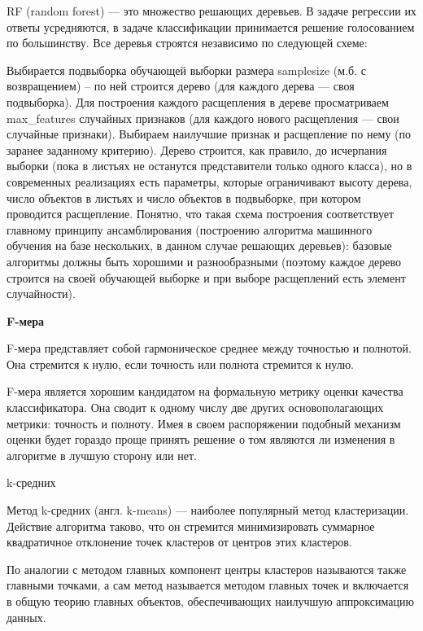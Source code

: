 \documentclass[14pt,a4paper]{scrartcl}
\begin{document}
RF (random forest) — это множество решающих деревьев. В задаче регрессии их ответы усредняются, в задаче классификации принимается решение голосованием по большинству. Все деревья строятся независимо по следующей схеме:

Выбирается подвыборка обучающей выборки размера samplesize (м.б. с возвращением) – по ней строится дерево (для каждого дерева — своя подвыборка).
Для построения каждого расщепления в дереве просматриваем max\_features случайных признаков (для каждого нового расщепления — свои случайные признаки).
Выбираем наилучшие признак и расщепление по нему (по заранее заданному критерию). Дерево строится, как правило, до исчерпания выборки (пока в листьях не останутся представители только одного класса), но в современных реализациях есть параметры, которые ограничивают высоту дерева, число объектов в листьях и число объектов в подвыборке, при котором проводится расщепление.
Понятно, что такая схема построения соответствует главному принципу ансамблирования (построению алгоритма машинного обучения на базе нескольких, в данном случае решающих деревьев): базовые алгоритмы должны быть хорошими и разнообразными (поэтому каждое дерево строится на своей обучающей выборке и при выборе расщеплений есть элемент случайности).

\item {\bf F-мера}

F-мера представляет собой гармоническое среднее между точностью и полнотой. Она стремится к нулю, если точность или полнота стремится к нулю.

F-мера является хорошим кандидатом на формальную метрику оценки качества классификатора. Она сводит к одному числу две других основополагающих метрики: точность и полноту. Имея в своем распоряжении подобный механизм оценки будет гораздо проще принять решение о том являются ли изменения в алгоритме в лучшую сторону или нет.

\item { k-средних}

Метод k-средних (англ. k-means) — наиболее популярный метод кластеризации. Действие алгоритма таково, что он стремится минимизировать суммарное квадратичное отклонение точек кластеров от центров этих кластеров.

По аналогии с методом главных компонент центры кластеров называются также главными точками, а сам метод называется методом главных точек и включается в общую теорию главных объектов, обеспечивающих наилучшую аппроксимацию данных.
\end{document}
